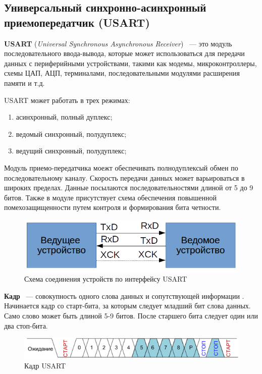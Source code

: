 \fi

\subsection{Универсальный синхронно-асинхронный\\ приемопередатчик (USART)}

\textbf{USART} (\textit{Universal Synchronous Asynchronous Receiver}) ~--- это модуль последовательного ввода-вывода, которые может использоваться для передачи данных с периферийными устройствами, такими как модемы, микроконтроллеры, схемы ЦАП, АЦП, терминалами, последовательными модулями расширения памяти и т.д. \cite{usart1}

USART может работать в трех режимах:
\begin{enumerate}
\item асинхронный, полный дуплекс;
\item ведомый синхронный, полудуплекс;
\item ведущий синхронный, полудуплекс;
\end{enumerate}

Модуль приемо-передатчика моежт обеспечивать полнодуплексый обмен по последовательному каналу. Скорость передачи данных может варьироваться в широких пределах. Данные посылаются последовательностями длиной от 5 до 9 битов. Также в модуле присутствует схема обеспечения повышенной помехозащищенности путем контроля и формирования бита четности.

\begin{figure}[H]
	\label{usartscheme}
	\centering
		\includegraphics[scale=0.8]{img/usartscheme.png}
	\caption{Схема соединения устройств по интерфейсу USART}
\end{figure}

\textbf{Кадр} ~--- совокупность одного слова данных и сопутствующей информации \cite{usart1}. Начинается кадр со старт-бита, за которым следует младший бит слова данных. Само слово может быть длиной 5-9 битов. После 
старшего бита следует один или два стоп-бита.

\begin{figure}[H]
	\label{usartframe}
	\centering
		\includegraphics[scale=0.8]{img/usartframe.png}
	\caption{Кадр USART\cite{usart1}}
\end{figure}

